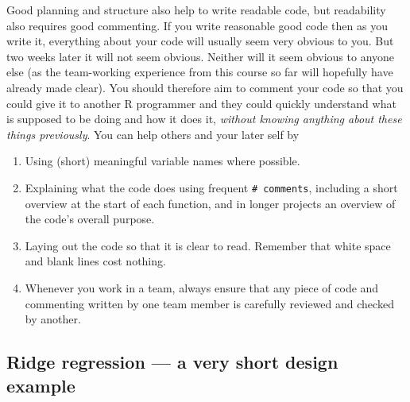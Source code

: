 \documentclass[10pt] {article}
\theoremstyle{definition}
\begin{document}
Good planning and structure also help to write readable code, but readability also requires good commenting. If you write reasonable good code then as you write it, everything about your code will usually seem very obvious to you. But two weeks later it will not seem obvious. Neither will it seem obvious to anyone else (as the team-working experience from this course so far will hopefully have already made clear). You should therefore aim to comment your code so that you could give it to another R programmer and they could quickly understand what is supposed to be doing and how it does it, {\em without knowing anything about these things previously}. You can help others and your later self by
\begin{enumerate}
\item Using (short) meaningful variable names where possible.
\item Explaining what the code does using frequent \verb+# comments+, including a short overview at the start of each function, and in longer projects an overview of the code's overall purpose. 
\item Laying out the code so that it is clear to read. Remember that white space and blank lines cost nothing.
\item Whenever you work in a team, always ensure that any piece of code and commenting written by one team member is carefully reviewed and checked by another.    
\end{enumerate}  

\subsection{Ridge regression ---  a very short design example}
\end{document}
